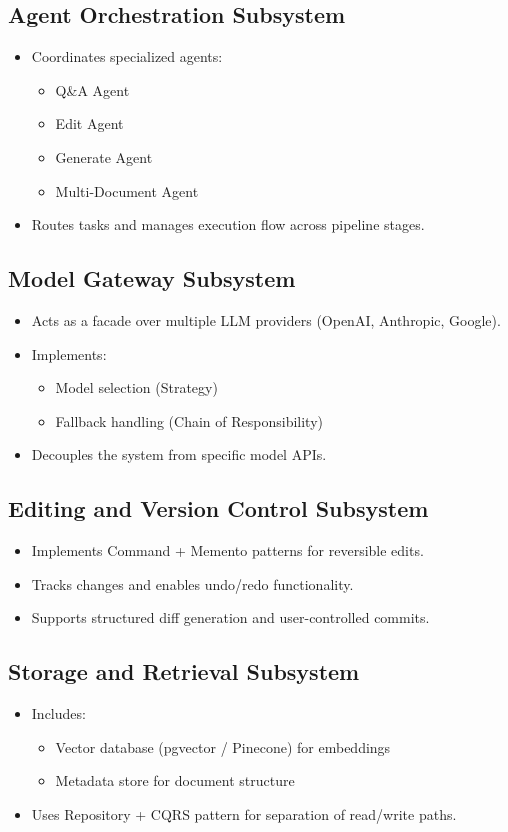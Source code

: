 \documentclass[12pt]{article}
\begin{document}
\subsection{Agent Orchestration Subsystem}
\begin{itemize}
   \item Coordinates specialized agents:
   \begin{itemize}
      \item Q\&A Agent
      \item Edit Agent
      \item Generate Agent
      \item Multi-Document Agent
   \end{itemize}
   \item Routes tasks and manages execution flow across pipeline stages.
\end{itemize}

\subsection{Model Gateway Subsystem}
\begin{itemize}
   \item Acts as a facade over multiple LLM providers (OpenAI, Anthropic, Google).
   \item Implements:
   \begin{itemize}
      \item Model selection (Strategy)
      \item Fallback handling (Chain of Responsibility)
   \end{itemize}
   \item Decouples the system from specific model APIs.
\end{itemize}

\subsection{Editing and Version Control Subsystem}
\begin{itemize}
   \item Implements Command + Memento patterns for reversible edits.
   \item Tracks changes and enables undo/redo functionality.
   \item Supports structured diff generation and user-controlled commits.
\end{itemize}

\subsection{Storage and Retrieval Subsystem}
\begin{itemize}
   \item Includes:
   \begin{itemize}
      \item Vector database (pgvector / Pinecone) for embeddings
      \item Metadata store for document structure
   \end{itemize}
   \item Uses Repository + CQRS pattern for separation of read/write paths.
\end{itemize}
\end{document}
